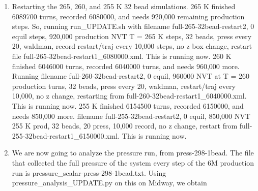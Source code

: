 \documentclass[12pt,reqno]{amsart}
\numberwithin{equation}{section}
\begin{document}
\begin{enumerate}
\item Restarting the 265, 260, and 255 K 32 bead simulations.  265 K finished 6089700 turns, recorded 6080000, and needs 920,000 remaining production steps.  So, running run\_UPDATE.sh with filename full-265-32bead-restart2, 0 equil steps, 920,000 production NVT T = 265 K steps, 32 beads, press every 20, waldman, record restart/traj every 10,000 steps, no z box change, restart file full-265-32bead-restart1\_6080000.xml.  This is running now.  260 K finished 6046000 turns, recorded 6040000 turns, and needs 960,000 more.  Running filename full-260-32bead-restart2, 0 equil, 960000 NVT at T = 260 production turns, 32 beads, press every 20, waldman, restart/traj every 10,000, no z change, restarting from full-260-32bead-restart1\_6040000.xml.  This is running now.  255 K finished 6154500 turns, recorded 6150000, and needs 850,000 more.  filename full-255-32bead-restart2, 0 equil, 850,000 NVT 255 K prod, 32 beads, 20 press, 10,000 record, no z change, restart from full-255-32bead-restart1\_6150000.xml.  This is running now.  
\item We are now going to analyze the pressure run, from press-298-1bead.  The file that collected the full pressure of the system every step of the 6M production run is pressure\_scalar-press-298-1bead.txt.  Using pressure\_analysis\_UPDATE.py on this on Midway, we obtain


\end{enumerate}
\end{document}
